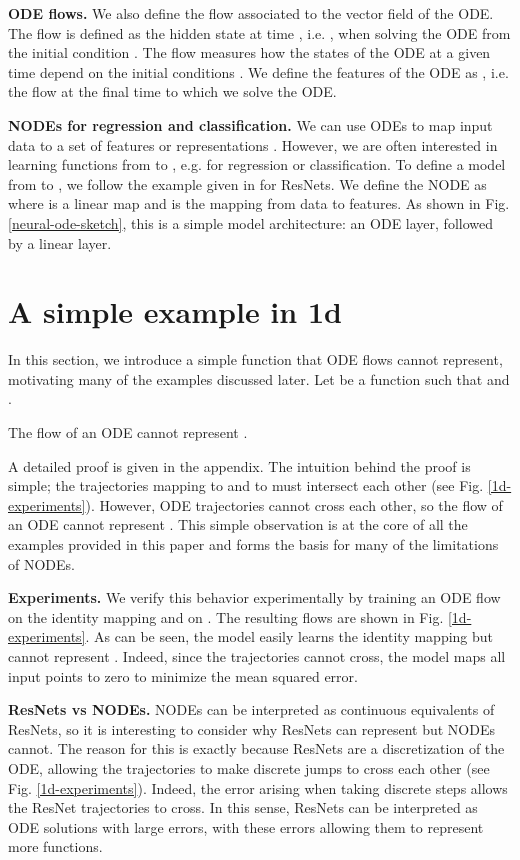 \documentclass{article}
\begin{document}
\textbf{ODE flows.} We also define the flow associated to the vector field  of the ODE. The flow  is defined as the hidden state at time , i.e. , when solving the ODE from the initial condition . The flow measures how the states of the ODE at a given time  depend on the initial conditions . We define the features of the ODE as , i.e. the flow at the final time  to which we solve the ODE.

\textbf{NODEs for regression and classification.} We can use ODEs to map input data  to a set of features or representations . However, we are often interested in learning functions from  to , e.g. for regression or classification. To define a model from  to , we follow the example given in \cite{lin2018resnet} for ResNets. We define the NODE  as  where  is a linear map and  is the mapping from data to features. As shown in Fig. \ref{neural-ode-sketch}, this is a simple model architecture: an ODE layer, followed by a linear layer.

\section{A simple example in 1d}

In this section, we introduce a simple function that ODE flows cannot represent, motivating many of the examples discussed later. Let  be a function such that  and .

\begin{prop}
The flow of an ODE cannot represent .
\end{prop}

A detailed proof is given in the appendix. The intuition behind the proof is simple; the trajectories mapping  to  and  to  must intersect each other (see Fig. \ref{1d-experiments}). However, ODE trajectories cannot cross each other, so the flow of an ODE cannot represent . This simple observation is at the core of all the examples provided in this paper and forms the basis for many of the limitations of NODEs.

\textbf{Experiments.} We verify this behavior experimentally by training an ODE flow on the identity mapping and on . The resulting flows are shown in Fig. \ref{1d-experiments}. As can be seen, the model easily learns the identity mapping but cannot represent . Indeed, since the trajectories cannot cross, the model maps all input points to zero to minimize the mean squared error.

\textbf{ResNets vs NODEs.} NODEs can be interpreted as continuous equivalents of ResNets, so it is interesting to consider why ResNets can represent  but NODEs cannot. The reason for this is exactly because ResNets are a discretization of the ODE, allowing the trajectories to make discrete jumps to cross each other (see Fig. \ref{1d-experiments}). Indeed, the error arising when taking discrete steps allows the ResNet trajectories to cross. In this sense, ResNets can be interpreted as ODE solutions with large errors, with these errors allowing them to represent more functions.
\end{document}
